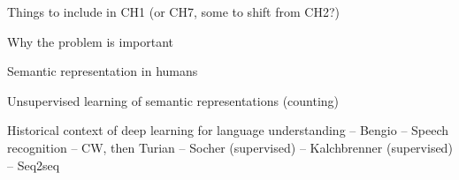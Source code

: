 
Things to include in CH1 (or CH7, some to shift from CH2?)

Why the problem is important

Semantic representation in humans

Unsupervised learning of semantic representations (counting)

Historical context of deep learning for language understanding
-- Bengio
-- Speech recognition
-- CW, then Turian
-- Socher (supervised)
-- Kalchbrenner (supervised)
-- Seq2seq

